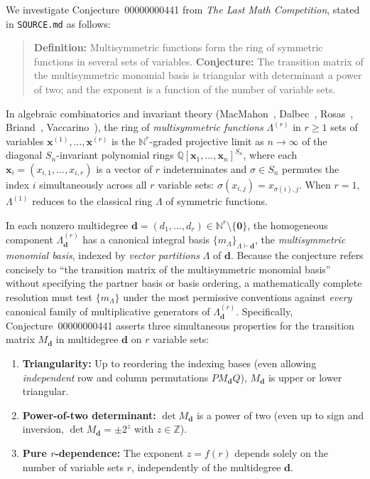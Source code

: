 \documentclass[11pt,a4paper]{article}
\theoremstyle{definition}
\theoremstyle{remark}
\newcommand{\NN}{\mathbb{N}}
\newcommand{\ZZ}{\mathbb{Z}}
\newcommand{\QQ}{\mathbb{Q}}
\newcommand{\vecd}{\mathbf{d}}
\newcommand{\vecx}{\mathbf{x}}
\begin{document}
We investigate Conjecture~00000000441 from \emph{The Last Math Competition}, stated in \texttt{SOURCE.md} as follows:
\begin{quote}
\textbf{Definition:} Multisymmetric functions form the ring of symmetric functions in several sets of variables. \textbf{Conjecture:} The transition matrix of the multisymmetric monomial basis is triangular with determinant a power of two; and the exponent is a function of the number of variable sets.
\end{quote}

In algebraic combinatorics and invariant theory (MacMahon~\cite{MacMahon}, Dalbec~\cite{Dalbec}, Rosas~\cite{Rosas}, Briand~\cite{Briand}, Vaccarino~\cite{Vaccarino}), the ring of \emph{multisymmetric functions} $\Lambda^{(r)}$ in $r \ge 1$ sets of variables $\vecx^{(1)}, \dots, \vecx^{(r)}$ is the $\NN^r$-graded projective limit as $n \to \infty$ of the diagonal $S_n$-invariant polynomial rings $\QQ[\vecx_1, \dots, \vecx_n]^{S_n}$, where each $\vecx_i = (x_{i,1}, \dots, x_{i,r})$ is a vector of $r$ indeterminates and $\sigma \in S_n$ permutes the index $i$ simultaneously across all $r$ variable sets: $\sigma(x_{i,j}) = x_{\sigma(i), j}$. When $r = 1$, $\Lambda^{(1)}$ reduces to the classical ring $\Lambda$ of symmetric functions.

In each nonzero multidegree $\vecd = (d_1, \dots, d_r) \in \NN^r \setminus \{\mathbf{0}\}$, the homogeneous component $\Lambda^{(r)}_{\vecd}$ has a canonical integral basis $\{m_\Lambda\}_{\Lambda \vdash \vecd}$, the \emph{multisymmetric monomial basis}, indexed by \emph{vector partitions} $\Lambda$ of $\vecd$. Because the conjecture refers concisely to ``the transition matrix of the multisymmetric monomial basis'' without specifying the partner basis or basis ordering, a mathematically complete resolution must test $\{m_\Lambda\}$ under the most permissive conventions against \emph{every} canonical family of multiplicative generators of $\Lambda^{(r)}_{\vecd}$. Specifically, Conjecture~00000000441 asserts three simultaneous properties for the transition matrix $M_{\vecd}$ in multidegree $\vecd$ on $r$ variable sets:
\begin{enumerate}
  \setlength{\itemsep}{2pt}
  \item[(C1)] \textbf{Triangularity:} Up to reordering the indexing bases (even allowing \emph{independent} row and column permutations $P M_{\vecd} Q$), $M_{\vecd}$ is upper or lower triangular.
  \item[(C2)] \textbf{Power-of-two determinant:} $\det M_{\vecd}$ is a power of two (even up to sign and inversion, $\det M_{\vecd} = \pm 2^z$ with $z \in \ZZ$).
  \item[(C3)] \textbf{Pure $r$-dependence:} The exponent $z = f(r)$ depends solely on the number of variable sets $r$, independently of the multidegree $\vecd$.
\end{enumerate}
\end{document}
